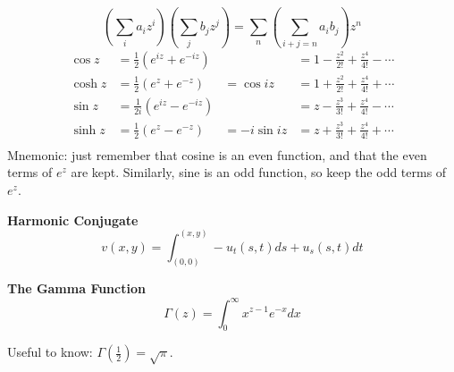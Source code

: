 \documentclass{article}
\begin{document}
\[
\left(\sum_i a_i z^i \right) \left( \sum_j b_j z^j\right) = \sum_n \left( \sum\limits_{i+j=n}a_ib_j \right) z^n
\]
\begin{align*}
%   
\cos z 
&= \frac{1}{2}(e^{iz} + e^{-iz})
&
&= 1 - \frac{z^2}{2!} + \frac{z^4}{4!} - \cdots \\
%
\cosh z 
&= \frac{1}{2}(e^{z} + e^{-z}) 
&= \cos iz 
&= 1 + \frac{z^2}{2!} + \frac{z^4}{4!} + \cdots \\
%
\sin z 
&= \frac{1}{2i}(e^{iz} - e^{-iz}) 
&
&= z - \frac{z^3}{3!} + \frac{z^4}{4!} - \cdots \\
%
\sinh z 
&= \frac{1}{2}(e^{z} - e^{-z}) 
&= -i\sin iz 
&= z + \frac{z^3}{3!} + \frac{z^4}{4!} + \cdots \\
\end{align*}
Mnemonic: just remember that cosine is an even function, and that the even terms of $e^z$ are kept. Similarly, sine is an odd function, so keep the odd terms of $e^z$.

\textbf{Harmonic Conjugate}
\[ v(x,y) = \int_{(0,0)}^{(x,y)} -u_t(s,t)ds + u_s(s,t)dt\]

\textbf{The Gamma Function}
\[ \Gamma(z) = \int_0^\infty x^{z-1} e^{-x} dx \]

Useful to know: $\Gamma(\frac{1}{2}) = \sqrt\pi$.


\end{document}
